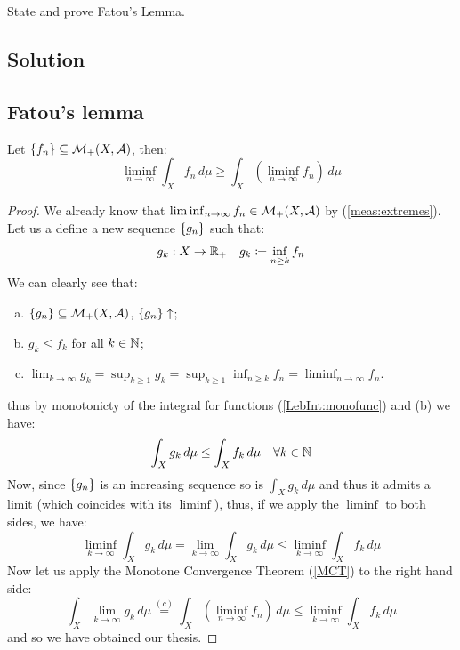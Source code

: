 
\question

State and prove Fatou's Lemma.

\subsection*{Solution}

\subsection{Fatou's lemma}

Let $\{ f_n \} \subseteq \mathcal{M}_+(X,\mathcal{A})$, then:
\[
    \liminf_{n\to\infty} \int_X f_n \, d\mu \geq \int_X \left( \liminf_{n\to\infty} f_n \right) \, d\mu
\]

\begin{proof}
    We already know that $\liminf_{n\to\infty} f_n \in \mathcal{M}_+(X,\mathcal{A})$ by (\ref{meas:extremes}).\\
    Let us a define a new sequence $\{ g_n \}$ such that:
    \[
        g_k: X \to \overline{\mathbb{R}}_{+} \quad g_k \coloneqq \inf_{n\geq k} f_n    
    \]
    We can clearly see that:
    \begin{enumerate}[a)]
        \item $\{ g_n \} \subseteq \mathcal{M}_+(X,\mathcal{A})$, $\{ g_n \} \uparrow$;
        \item $g_k \leq f_k$ for all $k\in\mathbb{N}$;
        \item $\lim_{k\to\infty} g_k = \sup_{k\geq 1} g_k = \sup_{k\geq 1} \inf_{n\geq k} f_n = \liminf_{n\to\infty} f_n$.
    \end{enumerate}
    thus by monotonicty of the integral for functions (\ref{LebInt:monofunc}) and (b) we have:
    \[
        \int_X g_k \, d\mu \leq \int_X  f_k \, d\mu \quad \forall k\in\mathbb{N}   
    \]
    Now, since $\{ g_n \}$ is an increasing sequence so is $\int_X g_k \, d\mu$ and thus it admits a limit (which coincides with its $\liminf$), thus, if we apply the $\liminf$ to both sides, we have:
    \[
        \liminf_{k\to\infty} \int_X g_k \, d\mu = \lim_{k\to\infty} \int_X  g_k \, d\mu \leq \liminf_{k\to\infty} \int_X f_k \, d\mu 
    \]
    Now let us apply the Monotone Convergence Theorem (\ref{MCT}) to the right hand side:
    \[
        \int_X \lim_{k\to\infty} g_k \, d\mu \overset{(c)}{=} \int_X \left( \liminf_{n\to\infty} f_n \right) \, d\mu \leq \liminf_{k\to\infty} \int_X f_k \, d\mu
    \]
    and so we have obtained our thesis.
\end{proof}

